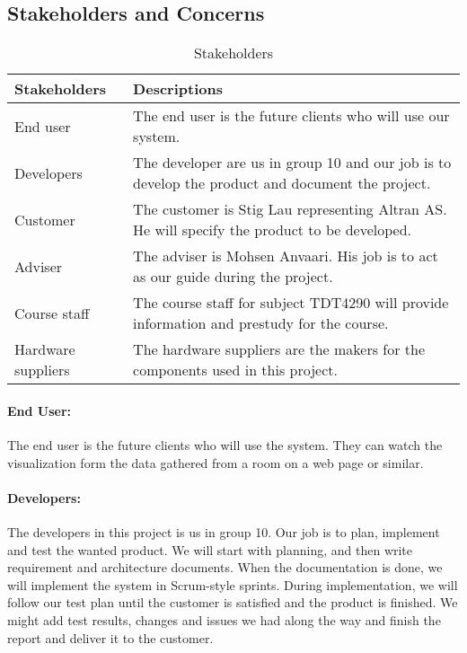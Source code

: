 \documentclass[../document.tex]{subfiles}
\begin{document}
\subsection{Stakeholders and Concerns}
\begin{table}[H]
	\caption{Stakeholders}
	\begin{tabularx}{\textwidth}{|X|X|}
		\hline
		\textbf{Stakeholders}	& \textbf{Descriptions} \\ \hline
		End user				& The end user is the future clients who will use our system.  \\ \hline
		Developers				& The developer are us in group 10 and our job is to develop the product and document the project.  \\ \hline
		Customer				& The customer is Stig Lau representing \gls{Altran} AS. He will specify the product to be developed.  \\ \hline
		Adviser					& The adviser is Mohsen Anvaari. His job is to act as our guide during the project.  \\ \hline
		Course staff			& The course staff for subject TDT4290 will provide information and prestudy for the course.  \\ \hline
		Hardware suppliers		& The hardware suppliers are the makers for the components used in this project.  \\ \hline
	\end{tabularx}
\end{table}

\paragraph{End User:} The end user is the future clients who will use the system. They can watch the visualization form the data gathered from a room on a web page or similar. 

\paragraph{Developers:} The developers in this project is us in group 10. Our job is to plan, implement and test the wanted product. We will start with planning, and then write requirement and architecture documents. When the documentation is done, we will implement the system in Scrum-style sprints. During implementation, we will follow our test plan until the customer is satisfied and the product is finished. We might add test results, changes and issues we had along the way and finish the report and deliver it to the customer.
\end{document}

